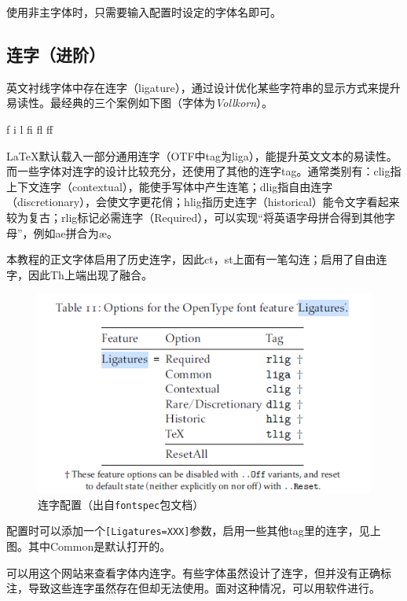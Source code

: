 \documentclass[10pt,openany]{book}
\begin{document}
\begin{sloppypar}
    

    使用非主字体时，只需要输入配置时设定的字体名即可。

    

    \subsection{连字（进阶）}

    英文衬线字体中存在连字（ligature），通过设计优化某些字符串的显示方式来提升易读性。最经典的三个案例如下图（字体为\textit{Vollkorn}）。

    \begin{minipage}[c][3\baselineskip]{30\ccwd}
        \centering{}\Huge f i l fi fl ff
    \end{minipage}

    {\LaTeX}默认载入一部分通用连字（OTF中tag为liga），能提升英文文本的易读性。而一些字体对连字的设计比较充分，还使用了其他的连字tag。通常类别有：clig指上下文连字（contextual），能使手写体中产生连笔；dlig指自由连字（discretionary），会使文字更花俏；hlig指历史连字（historical）能令文字看起来较为复古；rlig标记必需连字（Required），可以实现“将英语字母拼合得到其他字母”，例如ae拼合为æ。

    本教程的正文字体启用了历史连字，因此ct，st上面有一笔勾连；启用了自由连字，因此Th上端出现了融合。

    \begin{figure}[H]
        \centering
        \includegraphics[width=.6\linewidth]{data/ligatures.png}
        \caption{连字配置（出自\texttt{fontspec}包文档）}
    \end{figure}

    配置时可以添加一个\texttt{{[}Ligatures=XXX{]}}参数，启用一些其他tag里的连字，见上图。其中Common是默认打开的。

    可以用这个网站来查看字体内连字。有些字体虽然设计了连字，但并没有正确标注，导致这些连字虽然存在但却无法使用。面对这种情况，可以用软件进行。


\end{sloppypar}
\end{document}
